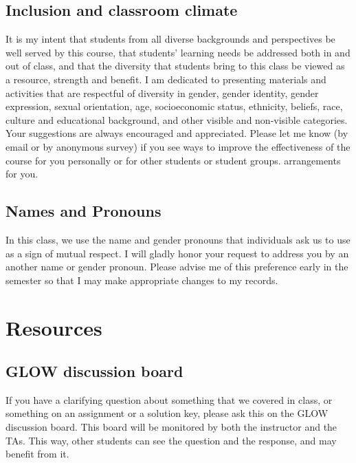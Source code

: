 \documentclass[11pt]{article}
\begin{document}
\subsection{Inclusion and classroom climate}

It is my intent that students from all diverse backgrounds and perspectives be well served by this
course, that students' learning needs be addressed both in and out of class, and that the diversity
that students bring to this class be viewed as a resource, strength and benefit. I am dedicated
to presenting materials and activities that are respectful of diversity in gender, gender identity,
gender expression, sexual orientation, age, socioeconomic status, ethnicity, beliefs, race, culture
and educational background, and other visible and non-visible categories. Your suggestions are always encouraged and appreciated. Please let me know (by email or by anonymous survey) if you see ways to improve the effectiveness of the course for you personally or for other students or student groups. %
arrangements for you.

\subsection{Names and Pronouns}

In this class, we use the name and gender pronouns that individuals ask us to use as a sign of mutual respect. I will gladly honor your request to address you by an another name or gender pronoun. Please advise me of this preference early in the semester so that I may make appropriate changes to my records. %

\section{Resources}

\subsection{GLOW discussion board}

If you have a clarifying question about something that we covered in class, or something on an assignment or a solution key, please ask this on the GLOW discussion board. This board will be monitored by both the instructor and the TAs. This way, other students can see the question and the response, and may benefit from it. 
\end{document}
